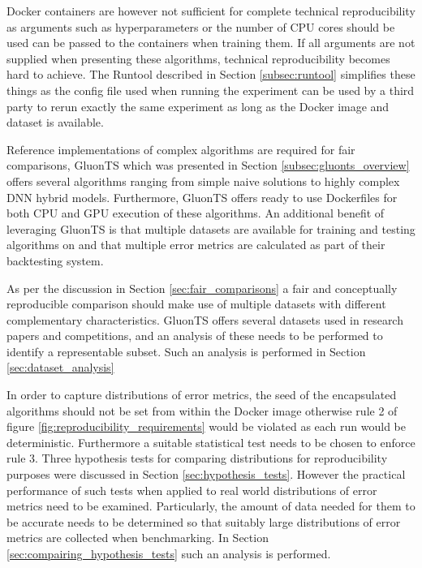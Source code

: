 Docker containers are however not sufficient for complete technical reproducibility as arguments such as hyperparameters or the number of CPU cores should be used can be passed to the containers when training them. If all arguments are not supplied when presenting these algorithms, technical reproducibility becomes hard to achieve. The Runtool described in Section \ref{subsec:runtool} simplifies these things as the config file used when running the experiment can be used by a third party to rerun exactly the same experiment as long as the Docker image and dataset is available.

Reference implementations of complex algorithms are required for fair comparisons, GluonTS which was presented in Section \ref{subsec:gluonts_overview} offers several algorithms ranging from simple naive solutions to highly complex DNN hybrid models. Furthermore, GluonTS offers ready to use Dockerfiles for both CPU and GPU execution of these algorithms. An additional benefit of leveraging GluonTS is that multiple datasets are available for training and testing algorithms on and that multiple error metrics are calculated as part of their backtesting system.

As per the discussion in Section \ref{sec:fair_comparisons} a fair and conceptually reproducible comparison should make use of multiple datasets with different complementary characteristics. GluonTS offers several datasets used in research papers and competitions, and an analysis of these needs to be performed to identify a representable subset. Such an analysis is performed in Section \ref{sec:dataset_analysis}

In order to capture distributions of error metrics, the seed of the encapsulated algorithms should not be set from within the Docker image otherwise rule 2 of figure \ref{fig:reproducibility_requirements} would be violated as each run would be deterministic. Furthermore a suitable statistical test needs to be chosen to enforce rule 3. Three hypothesis tests for comparing distributions for reproducibility purposes were discussed in Section \ref{sec:hypothesis_tests}. However the practical performance of such tests when applied to real world distributions of error metrics need to be examined. Particularly, the amount of data needed for them to be accurate needs to be determined so that suitably large distributions of error metrics are collected when benchmarking. In Section \ref{sec:compairing_hypothesis_tests} such an analysis is performed.


